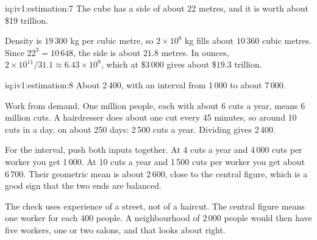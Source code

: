 \begin{solution}{iq:iv1:estimation:7}
The cube has a side of about 22 metres, and it is worth about \$19 trillion.

Density is $19\,300$ kg per cubic metre, so $2 \times 10^8$ kg fills about $10\,360$ cubic metres. Since $22^3 = 10\,648$, the side is about $21.8$ metres. In ounces, $2 \times 10^{11}/31.1 \approx 6.43 \times 10^9$, which at \$3\,000 gives about \$$19.3$ trillion.

\end{solution}

\begin{solution}{iq:iv1:estimation:8}
About 2\,400, with an interval from 1\,000 to about 7\,000.

Work from demand. One million people, each with about 6 cuts a year, means 6 million cuts. A hairdresser does about one cut every 45 minutes, so around 10 cuts in a day, on about 250 days: 2\,500 cuts a year. Dividing gives 2\,400.

For the interval, push both inputs together. At 4 cuts a year and 4\,000 cuts per worker you get 1\,000. At 10 cuts a year and 1\,500 cuts per worker you get about 6\,700. Their geometric mean is about 2\,600, close to the central figure, which is a good sign that the two ends are balanced.

The check uses experience of a street, not of a haircut. The central figure means one worker for each 400 people. A neighbourhood of 2\,000 people would then have five workers, one or two salons, and that looks about right.

\end{solution}

